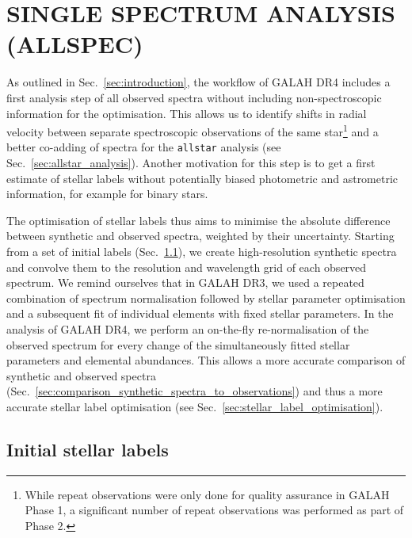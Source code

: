 \documentclass[
  journal=pasa,
  manuscript=research-paper, %
  year=2024,
  volume=37
]{cup-journal}
\begin{document}
\section{SINGLE SPECTRUM ANALYSIS (ALLSPEC)}
\label{sec:allspec_analysis}

As outlined in Sec.~\ref{sec:introduction}, the workflow of GALAH DR4 includes a first analysis step of all observed spectra without including non-spectroscopic information for the optimisation. This allows us to identify shifts in radial velocity between separate spectroscopic observations of the same star\footnote{While repeat observations were only done for quality assurance in GALAH Phase 1, a significant number of repeat observations was performed as part of Phase 2.} and a better co-adding of spectra for the \texttt{allstar} analysis (see Sec.~\ref{sec:allstar_analysis}). Another motivation for this step is to get a first estimate of stellar labels without potentially biased photometric and astrometric information, for example for binary stars.

The optimisation of stellar labels thus aims to minimise the absolute difference between synthetic and observed spectra, weighted by their uncertainty. Starting from a set of initial labels (Sec.~\ref{sec:initial_stellar_labels}), we create high-resolution synthetic spectra and convolve them to the resolution and wavelength grid of each observed spectrum. We remind ourselves that in GALAH DR3, we used a repeated combination of spectrum normalisation followed by stellar parameter optimisation and a subsequent fit of individual elements with fixed stellar parameters. In the analysis of GALAH DR4, we perform an on-the-fly re-normalisation of the observed spectrum for every change of the simultaneously fitted stellar parameters and elemental abundances. This allows a more accurate comparison of synthetic and observed spectra (Sec.~\ref{sec:comparison_synthetic_spectra_to_observations}) and thus a more accurate stellar label optimisation (see Sec.~\ref{sec:stellar_label_optimisation}).

\subsection{Initial stellar labels}
\label{sec:initial_stellar_labels}
\end{document}

